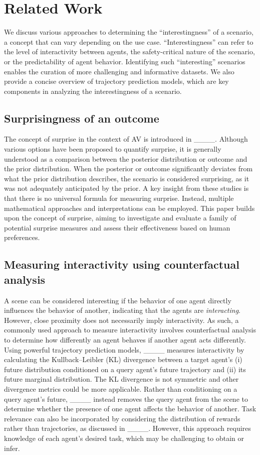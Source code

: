 \section{Related Work}
We discuss various approaches to determining the ``interestingness'' of a scenario, a concept that can vary depending on the use case. ``Interestingness'' can refer to the level of interactivity between agents, the safety-critical nature of the scenario, or the predictability of agent behavior. Identifying such ``interesting'' scenarios enables the curation of more challenging and informative datasets. We also provide a concise overview of trajectory prediction models, which are key components in analyzing the interestingness of a scenario.

\subsection{Surprisingness of an outcome}
The concept of surprise in the context of AV is introduced in ____. Although various options have been proposed to quantify surprise, it is generally understood as a comparison between the posterior distribution or outcome and the prior distribution. 
When the posterior or outcome significantly deviates from what the prior distribution describes, the scenario is considered surprising, as it was not adequately anticipated by the prior. A key insight from these studies is that there is no universal formula for measuring surprise. Instead, multiple mathematical approaches and interpretations can be employed. This paper builds upon the concept of surprise, aiming to investigate and evaluate a family of potential surprise measures and assess their effectiveness based on human preferences.

\subsection{Measuring interactivity using counterfactual analysis}
A scene can be considered interesting if the behavior of one agent directly influences the behavior of another, indicating that the agents are \textit{interacting}. However, close proximity does not necessarily imply interactivity. As such, a commonly used approach to measure interactivity involves counterfactual analysis to determine how differently an agent behaves if another agent acts differently. Using powerful trajectory prediction models, ____ measures interactivity by calculating the Kullback–Leibler (KL) divergence between a target agent's (i) future distribution conditioned on a query agent's future trajectory and (ii) its future marginal distribution. The KL divergence is not symmetric and other divergence metrics could be more applicable. Rather than conditioning on a query agent's future, ____ instead removes the query agent from the scene to determine whether the presence of one agent affects the behavior of another. Task relevance can also be incorporated by considering the distribution of rewards rather than trajectories, as discussed in ____. However, this approach requires knowledge of each agent's desired task, which may be challenging to obtain or infer.

